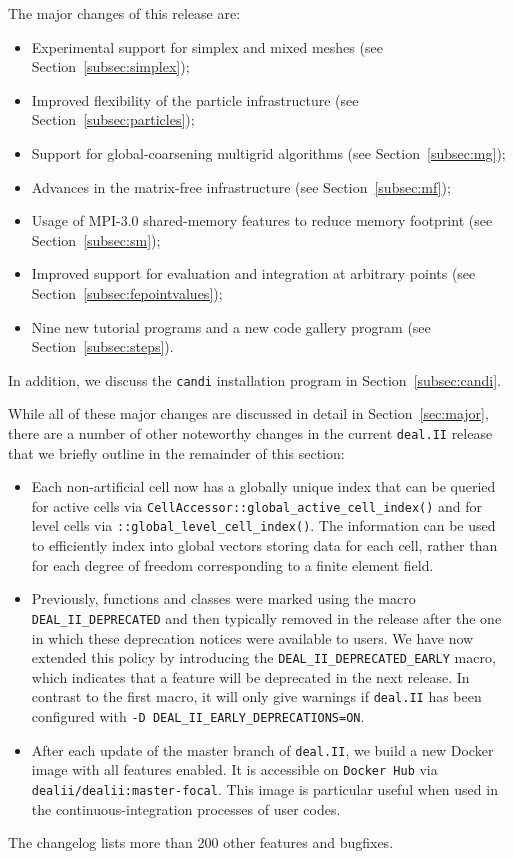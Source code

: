 \documentclass{ansarticle-preprint}
\newcommand{\specialword}[1]{\texttt{#1}}
\newcommand{\dealii}{{\specialword{deal.II}}\xspace}
\begin{document}
The major changes of this release are:
%
\begin{itemize}
  \item Experimental support for simplex and mixed meshes (see Section~\ref{subsec:simplex});
  \item Improved flexibility of the particle infrastructure (see Section~\ref{subsec:particles});
  \item Support for global-coarsening multigrid algorithms (see Section~\ref{subsec:mg});
  \item Advances in the matrix-free infrastructure  (see Section~\ref{subsec:mf});
  \item Usage of MPI-3.0 shared-memory features to reduce memory footprint  (see Section~\ref{subsec:sm});
  \item Improved support for evaluation and integration at arbitrary points (see Section~\ref{subsec:fepointvalues});
  \item Nine new tutorial programs and a new code gallery program (see Section~\ref{subsec:steps}).
\end{itemize}
%
In addition, we discuss the \texttt{candi} installation program in Section~\ref{subsec:candi}.

While all of these major changes are discussed in detail in
Section~\ref{sec:major}, there
are a number of other noteworthy changes in the current \dealii{} release
that we briefly outline in the remainder of this section:
%
\begin{itemize}
  \item Each non-artificial cell now has a globally unique index that can be queried
  for active cells via \texttt{CellAccessor::global\_active\_cell\_index()} and for level cells 
  via \texttt{::global\_\allowbreak level\_\allowbreak cell\_\allowbreak index()}. The information
  can be used to efficiently index into global vectors storing data
  for each cell, rather than for each degree of freedom corresponding to a finite
  element field.
  
  \item Previously, functions and classes were marked using the 
  macro \texttt{DEAL\_II\_DEPRECATED} and then typically removed in
  the release after the one in which these deprecation notices were
  available to users. We have now extended this policy by introducing
  the \texttt{DEAL\_II\_\allowbreak DEPRECATED\_EARLY} macro, which indicates that a feature will be
  deprecated in the next release. In contrast to the first macro, it will only give
  warnings if \dealii{} has been configured with \texttt{-D DEAL\_II\_EARLY\_DEPRECATIONS=ON}.
  \item After each update of the master branch of \dealii{}, we build a new Docker image
  with all features enabled. It is
  accessible on \texttt{Docker Hub} via \texttt{dealii/dealii:master-focal}. This image is
  particular useful when used in the continuous-integration processes of user codes.
\end{itemize}
%
The changelog lists more than 200 other features and bugfixes.
\end{document}
